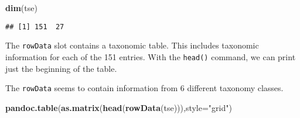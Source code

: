 \documentclass[
  oneside]{book}
\newenvironment{Shaded}{\begin{snugshade}}{\end{snugshade}}
\newcommand{\DataTypeTok}[1]{\textcolor[rgb]{0.13,0.29,0.53}{#1}}
\newcommand{\KeywordTok}[1]{\textcolor[rgb]{0.13,0.29,0.53}{\textbf{#1}}}
\newcommand{\NormalTok}[1]{#1}
\newcommand{\StringTok}[1]{\textcolor[rgb]{0.31,0.60,0.02}{#1}}
\begin{document}
\begin{Shaded}
\begin{Highlighting}[]
\KeywordTok{dim}\NormalTok{(tse)}
\end{Highlighting}
\end{Shaded}

\begin{verbatim}
## [1] 151  27
\end{verbatim}

The \texttt{rowData} slot contains a taxonomic table. This includes taxonomic
information for each of the 151 entries. With the \texttt{head()}
command, we can print just the beginning of the table.

The \texttt{rowData} seems to contain information from 6
different taxonomy classes.

\begin{Shaded}
\begin{Highlighting}[]
\KeywordTok{pandoc.table}\NormalTok{(}\KeywordTok{as.matrix}\NormalTok{(}\KeywordTok{head}\NormalTok{(}\KeywordTok{rowData}\NormalTok{(tse))),}\DataTypeTok{style=}\StringTok{"grid"}\NormalTok{)}
\end{Highlighting}
\end{Shaded}
\end{document}
